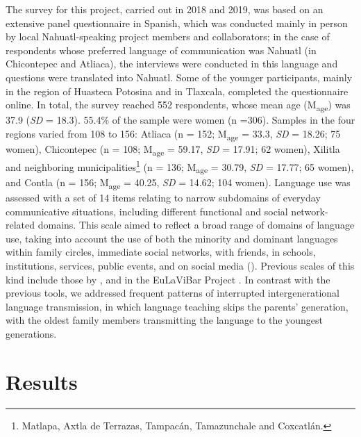\documentclass[output=paper,hidelinks]{langscibook}
\begin{document}
The survey for this project, carried out in 2018 and 2019, was based on an extensive panel questionnaire in Spanish, which was conducted mainly in person by local Nahuatl-speaking project members and collaborators; in the case of respondents whose preferred language of communication was Nahuatl (in Chicontepec and Atliaca), the interviews were conducted in this language and questions were translated into Nahuatl. Some of the younger participants, mainly in the region of Huasteca Potosina and in Tlaxcala, completed the questionnaire online. In total, the survey reached 552 respondents, whose mean age (M\textsubscript{age}) was 37.9 (\textit{SD} = 18.3). 55.4\% of the sample were women (n =306). Samples in the four regions varied from 108 to 156: Atliaca (n = 152; M\textsubscript{age} = 33.3, \textit{SD} = 18.26; 75 women), Chicontepec (n = 108; M\textsubscript{age} = 59.17, \textit{SD} = 17.91; 62 women), Xilitla and neighboring municipalities\footnote{Matlapa, Axtla de Terrazas, Tampacán, Tamazunchale and Coxcatlán.} (n = 136; M\textsubscript{age} = 30.79, \textit{SD} = 17.77; 65 women), and Contla (n = 156; M\textsubscript{age} = 40.25, \textit{SD} = 14.62; 104 women). Language use was assessed with a set of 14 items relating to narrow subdomains of everyday communicative situations, including different functional and social network-related domains. This scale aimed to reflect a broad range of domains of language use, taking into account the use of both the minority and dominant languages within family circles, immediate social networks, with friends, in schools, institutions, services, public events, and on social media (). Previous scales of this kind include those by \citet{landry1994, ehala2014}, and in the EuLaViBar Project \citep{akermark2013}. In contrast with the previous tools, we addressed frequent patterns of interrupted intergenerational language transmission, in which language teaching skips the parents’ generation, with the oldest family members transmitting the language to the youngest generations.

\section{Results}
\end{document}
